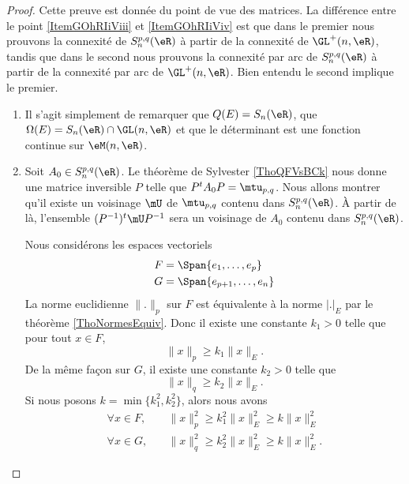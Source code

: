 \begin{proof}
    Cette preuve est donnée du point de vue des matrices. La différence entre le point \ref{ItemGOhRIiViii} et \ref{ItemGOhRIiViv} est que dans le premier nous prouvons la connexité de \( S_n^{p,q}(\eR)\) à partir de la connexité de \( \GL^+(n,\eR)\), tandis que dans le second nous prouvons la connexité par arc de \( S_n^{p,q}(\eR)\) à partir de la connexité par arc de \( \GL^+(n,\eR)\). Bien entendu le second implique le premier.
    \begin{enumerate}
        \item
            Il s'agit simplement de remarquer que \( Q(E)=S_n(\eR)\), que \( \Omega(E)=S_n(\eR)\cap\GL(n,\eR)\) et que le déterminant est une fonction continue sur \( \eM(n,\eR)\).
        \item
            Soit \( A_0\in S_n^{p,q}(\eR)\). Le théorème de Sylvester \ref{ThoQFVsBCk} nous donne une matrice inversible \( P\) telle que \( P^tA_0P=\mtu_{p,q}\). Nous allons montrer qu'il existe un voisinage \( \mU\) de \( \mtu_{p,q}\) contenu dans \( S_n^{p,q}(\eR)\). À partir de là, l'ensemble \( (P^{-1})^t\mU P^{-1}\) sera un voisinage de \( A_0\) contenu dans \( S_n^{p,q}(\eR)\).

            Nous considérons les espaces vectoriels
            \begin{subequations}
                \begin{align}
                    F&=\Span\{ e_1,\ldots, e_p \}\\
                    G&=\Span\{ e_{p+1},\ldots, e_n \}
                \end{align}
            \end{subequations}
            La norme euclidienne \( \| . \|_p\) sur \( F\) est équivalente à la norme \( | . |_E\) par le théorème \ref{ThoNormesEquiv}. Donc il existe une constante \( k_1>0\) telle que pour tout \( x\in F\),
            \begin{equation}    \label{EqMViCjJJ}
                \| x \|_p\geq k_1\| x \|_E.
            \end{equation}
            De la même façon sur \( G\), il existe une constante \( k_2>0\) telle que
            \begin{equation}    \label{EqSFwOcDw}
                \| x \|_q\geq k_2\| x \|_E.
            \end{equation}
            Si nous posons \( k=\min\{ k_1^2,k_2^2 \}\), alors nous avons
            \begin{subequations}
                \begin{align}
                    \forall x\in F,\quad &\| x \|_p^2\geq k_1^2\| x \|_E^2\geq k\| x \|_E^2\\
                    \forall x\in G,\quad &\| x \|_q^2\geq k_2^2\| x \|_E^2\geq k\| x \|_E^2.
                \end{align}
            \end{subequations}
            

\end{enumerate}
\end{proof}
